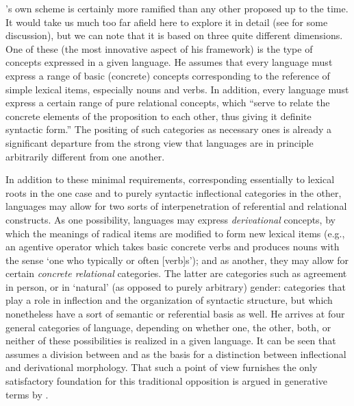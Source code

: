 {\Sapir}'s own scheme is certainly more ramified than any other proposed
up to the time. It would take us much too far afield here to explore
it in detail (see \citealt{sra90:krems} for some discussion), but we
can note that it is based on three quite different dimensions. One of
these (the most innovative aspect of his framework) is the type of
concepts expressed in a given language. He assumes that every language
must express a range of basic (concrete) concepts corresponding to the
reference of simple lexical items, especially nouns and verbs. In
addition, every language must express a certain range of pure
relational concepts, which ``serve to relate the concrete elements of
the proposition to each other, thus giving it definite syntactic
form.'' The positing of such categories as necessary ones is already a
significant departure from the strong view that languages are in
principle arbitrarily different from one another.

In addition to these minimal requirements, corresponding essentially
to lexical roots in the one case and to purely syntactic inflectional
categories in the other, languages may allow for two sorts of
interpenetration of referential and relational constructs. As one
possibility, languages may express \emph{derivational} concepts, by
which the meanings of radical items are modified to form new lexical
items (e.g., an agentive operator which takes basic concrete verbs and
produces nouns with the sense `one who typically or often [verb]s');
and as another, they may allow for certain \emph{concrete relational}
categories. The latter are categories such as agreement in person, or
in `natural' (as opposed to purely arbitrary) gender: categories that
play a role in inflection and the organization of syntactic structure,
but which nonetheless have a sort of semantic or referential basis as
well. He arrives at four general categories of language, depending on
whether one, the other, both, or neither of these possibilities is
realized in a given language. It can be seen that {\Sapir} assumes a
division between  and  as the basis for a distinction
between inflectional and derivational morphology.  That such a point
of view furnishes the only satisfactory foundation for this
traditional opposition is argued in generative terms by
\citet{sra82:wheresmorphology}.

